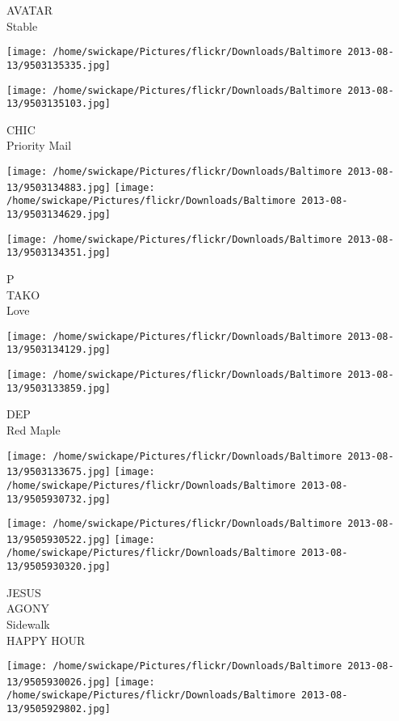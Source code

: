 \documentclass[10pt,letterpaper]{article}
\begin{document}
AVATAR\\
Stable
\pagebreak

\texttt{[image: /home/swickape/Pictures/flickr/Downloads/Baltimore 2013-08-13/9503135335.jpg]}

\vspace{0.25in}
\texttt{[image: /home/swickape/Pictures/flickr/Downloads/Baltimore 2013-08-13/9503135103.jpg]}

CHIC\\
Priority Mail
\pagebreak

\texttt{[image: /home/swickape/Pictures/flickr/Downloads/Baltimore 2013-08-13/9503134883.jpg]}
\texttt{[image: /home/swickape/Pictures/flickr/Downloads/Baltimore 2013-08-13/9503134629.jpg]}

\vspace{0.25in}
\texttt{[image: /home/swickape/Pictures/flickr/Downloads/Baltimore 2013-08-13/9503134351.jpg]}

P\\
TAKO\\
Love
\pagebreak

\texttt{[image: /home/swickape/Pictures/flickr/Downloads/Baltimore 2013-08-13/9503134129.jpg]}

\vspace{0.25in}
\texttt{[image: /home/swickape/Pictures/flickr/Downloads/Baltimore 2013-08-13/9503133859.jpg]}

DEP\\
Red Maple
\pagebreak

\texttt{[image: /home/swickape/Pictures/flickr/Downloads/Baltimore 2013-08-13/9503133675.jpg]}
\texttt{[image: /home/swickape/Pictures/flickr/Downloads/Baltimore 2013-08-13/9505930732.jpg]}

\texttt{[image: /home/swickape/Pictures/flickr/Downloads/Baltimore 2013-08-13/9505930522.jpg]}
\texttt{[image: /home/swickape/Pictures/flickr/Downloads/Baltimore 2013-08-13/9505930320.jpg]}

JESUS\\
AGONY\\
Sidewalk\\
HAPPY HOUR
\pagebreak

\texttt{[image: /home/swickape/Pictures/flickr/Downloads/Baltimore 2013-08-13/9505930026.jpg]}
\texttt{[image: /home/swickape/Pictures/flickr/Downloads/Baltimore 2013-08-13/9505929802.jpg]}
\end{document}
